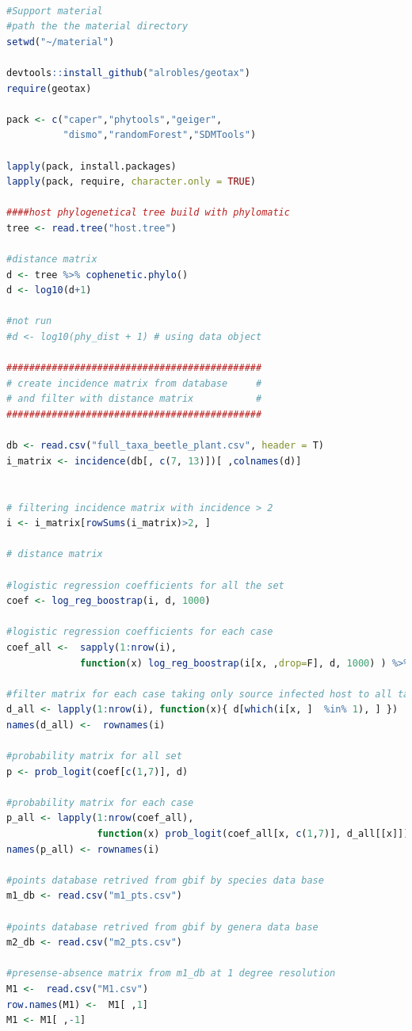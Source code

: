 \documentclass[utf8]{frontiers_suppmat} %
\begin{document}
\begin{lstlisting}[language=R]

#Support material
#path the the material directory
setwd("~/material")

devtools::install_github("alrobles/geotax")
require(geotax)

pack <- c("caper","phytools","geiger",
          "dismo","randomForest","SDMTools")

lapply(pack, install.packages)
lapply(pack, require, character.only = TRUE)
  
####host phylogenetical tree build with phylomatic
tree <- read.tree("host.tree")

#distance matrix
d <- tree %>% cophenetic.phylo()
d <- log10(d+1)

#not run
#d <- log10(phy_dist + 1) # using data object

#############################################
# create incidence matrix from database     #
# and filter with distance matrix           #
#############################################

db <- read.csv("full_taxa_beetle_plant.csv", header = T)
i_matrix <- incidence(db[, c(7, 13)])[ ,colnames(d)]


# filtering incidence matrix with incidence > 2
i <- i_matrix[rowSums(i_matrix)>2, ]

# distance matrix

#logistic regression coefficients for all the set
coef <- log_reg_boostrap(i, d, 1000)

#logistic regression coefficients for each case
coef_all <-  sapply(1:nrow(i),
			 function(x) log_reg_boostrap(i[x, ,drop=F], d, 1000) ) %>% t

#filter matrix for each case taking only source infected host to all target host
d_all <- lapply(1:nrow(i), function(x){ d[which(i[x, ]  %in% 1), ] })
names(d_all) <-  rownames(i)

#probability matrix for all set
p <- prob_logit(coef[c(1,7)], d)

#probability matrix for each case
p_all <- lapply(1:nrow(coef_all),
                function(x) prob_logit(coef_all[x, c(1,7)], d_all[[x]]) )
names(p_all) <- rownames(i)

#points database retrived from gbif by species data base
m1_db <- read.csv("m1_pts.csv") 

#points database retrived from gbif by genera data base
m2_db <- read.csv("m2_pts.csv") 

#presense-absence matrix from m1_db at 1 degree resolution
M1 <-  read.csv("M1.csv")   
row.names(M1) <-  M1[ ,1]
M1 <- M1[ ,-1]


\end{lstlisting}
\end{document}
